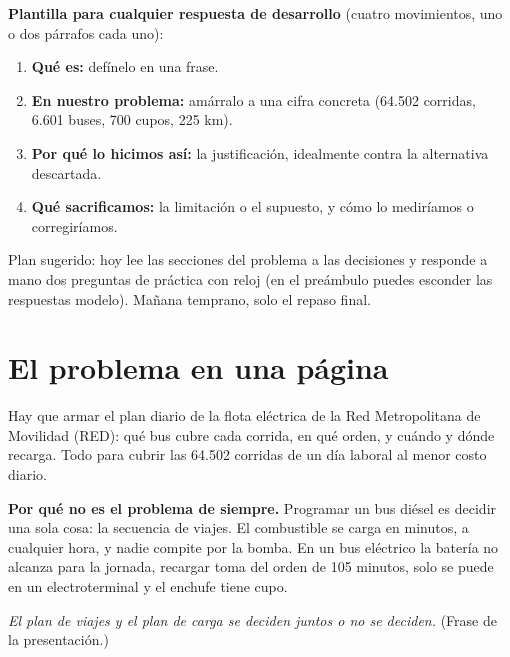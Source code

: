 \documentclass[11pt,a4paper,parskip=half]{scrartcl}
\newcounter{preg}
\begin{document}
\begin{clave}
\textbf{Plantilla para cualquier respuesta de desarrollo} (cuatro movimientos, uno o dos párrafos cada uno):
\begin{enumerate}
  \item \textbf{Qué es:} defínelo en una frase.
  \item \textbf{En nuestro problema:} amárralo a una cifra concreta (64.502 corridas, 6.601 buses, 700 cupos, 225 km).
  \item \textbf{Por qué lo hicimos así:} la justificación, idealmente contra la alternativa descartada.
  \item \textbf{Qué sacrificamos:} la limitación o el supuesto, y cómo lo mediríamos o corregiríamos.
\end{enumerate}
\end{clave}

Plan sugerido: hoy lee las secciones del problema a las decisiones y responde a mano dos preguntas de práctica con reloj (en el preámbulo puedes esconder las respuestas modelo). Mañana temprano, solo el repaso final.

\section{El problema en una página}
\label{sec:problema}

Hay que armar el plan diario de la flota eléctrica de la Red Metropolitana de Movilidad (RED): qué bus cubre cada corrida, en qué orden, y cuándo y dónde recarga. Todo para cubrir las 64.502 corridas de un día laboral al menor costo diario.

\textbf{Por qué no es el problema de siempre.} Programar un bus diésel es decidir una sola cosa: la secuencia de viajes. El combustible se carga en minutos, a cualquier hora, y nadie compite por la bomba. En un bus eléctrico la batería no alcanza para la jornada, recargar toma del orden de 105 minutos, solo se puede en un electroterminal y el enchufe tiene cupo.

\begin{clave}
\emph{El plan de viajes y el plan de carga se deciden juntos o no se deciden.} (Frase de la presentación.)
\end{clave}
\end{document}
